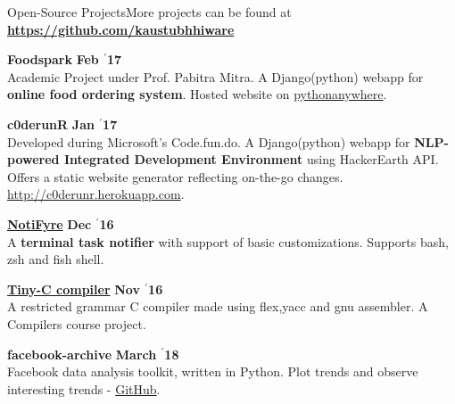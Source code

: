 \documentclass{resume} %
\begin{document}

\begin{rSection}{\large Open-Source Projects}{}{More projects can be found at \textbf{\large \url{https://github.com/kaustubhhiware}}}

{\bf \large Foodspark} \hfill \textbf{Feb $^{\prime}$17} \\ 
Academic Project under Prof. Pabitra Mitra. A Django(python) webapp for \textbf{online food ordering system}. Hosted website on \href{http://foodkgp.pythonanywhere.com}{pythonanywhere}.

{\bf \large c0derunR} \hfill \textbf{Jan $^{\prime}$17} \\ 
Developed during Microsoft's Code.fun.do. A Django(python) webapp for \textbf{NLP-powered Integrated Development Environment} using HackerEarth API. Offers a static website generator reflecting on-the-go changes. \url{http://c0derunr.herokuapp.com}.

{\bf \large \href{https://github.com/kaustubhhiware/NotiFyre}{NotiFyre}} \hfill \textbf{Dec $^{\prime}$16} \\ 
A \textbf{terminal task notifier} with support of basic customizations. Supports bash, zsh and fish shell.

{\bf \large \href{https://github.com/kaustubhhiware/cOMPILER}{Tiny-C compiler}} \hfill \textbf{Nov $^{\prime}$16} \\ 
A restricted grammar C compiler made using flex,yacc and gnu assembler. A Compilers course project.

{\bf \large facebook-archive} \hfill \textbf{March $^{\prime}$18} \\ 
Facebook data analysis toolkit, written in Python. Plot trends and observe interesting trends -  \href{https://github.com/kaustubhhiware/facebook-archive}{GitHub}.



\end{rSection}
\end{document}
